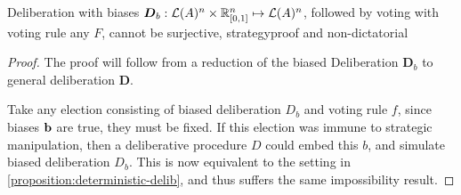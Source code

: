 \begin{corollary}
	\label{corollary:biased-delib}
	Deliberation with biases $\boldsymbol{D}_b: \mathcal{L}(A) ^ n \times \mathbb{R}_{[0,1]}^n \mapsto \mathcal{L}(A)^n$, followed by voting with voting rule any $F$, cannot be surjective, strategyproof and non-dictatorial
\end{corollary}

\begin{proof}{} 
	The proof will follow from a reduction of the biased Deliberation $\boldsymbol{D}_b$ to general deliberation $\boldsymbol{D}$. 

	Take any election consisting of biased deliberation $D_b$ and voting rule $f$, since biases $\bold{b}$ are true, they must be fixed. If this election was immune to strategic manipulation, then a deliberative procedure $D$ could embed this $b$, and simulate biased deliberation $D_b$. This is now equivalent to the setting in \cref{proposition:deterministic-delib}, and thus suffers the same impossibility result.

	
\end{proof}



